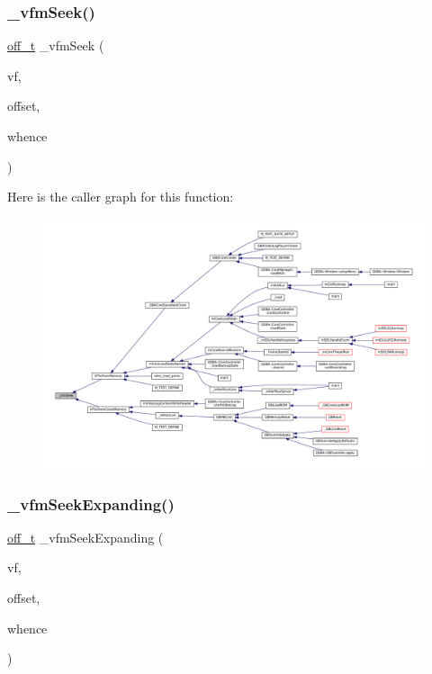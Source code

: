 \subsubsection{\texorpdfstring{\+\_\+vfm\+Seek()}{\_vfmSeek()}}
{\footnotesize\ttfamily \mbox{\hyperlink{__builder_8h_a53066be3c3a28d8b8ccb3dc95c1e49b1}{off\+\_\+t}} \+\_\+vfm\+Seek (\begin{DoxyParamCaption}\item[{struct V\+File $\ast$}]{vf,  }\item[{\mbox{\hyperlink{__builder_8h_a53066be3c3a28d8b8ccb3dc95c1e49b1}{off\+\_\+t}}}]{offset,  }\item[{\mbox{\hyperlink{ioapi_8h_a787fa3cf048117ba7123753c1e74fcd6}{int}}}]{whence }\end{DoxyParamCaption})\hspace{0.3cm}{\ttfamily [static]}}

Here is the caller graph for this function\+:
\nopagebreak
\begin{figure}[H]
\begin{center}
\leavevmode
\includegraphics[width=350pt]{vfs-mem_8c_ad6a2ccb75384ff6a3250c97887f3eab8_icgraph}
\end{center}
\end{figure}
\mbox{\label{vfs-mem_8c_a64c95798476ef7c379ec749c009d1de5}} 
\subsubsection{\texorpdfstring{\+\_\+vfm\+Seek\+Expanding()}{\_vfmSeekExpanding()}}
{\footnotesize\ttfamily \mbox{\hyperlink{__builder_8h_a53066be3c3a28d8b8ccb3dc95c1e49b1}{off\+\_\+t}} \+\_\+vfm\+Seek\+Expanding (\begin{DoxyParamCaption}\item[{struct V\+File $\ast$}]{vf,  }\item[{\mbox{\hyperlink{__builder_8h_a53066be3c3a28d8b8ccb3dc95c1e49b1}{off\+\_\+t}}}]{offset,  }\item[{\mbox{\hyperlink{ioapi_8h_a787fa3cf048117ba7123753c1e74fcd6}{int}}}]{whence }\end{DoxyParamCaption})\hspace{0.3cm}{\ttfamily [static]}}

